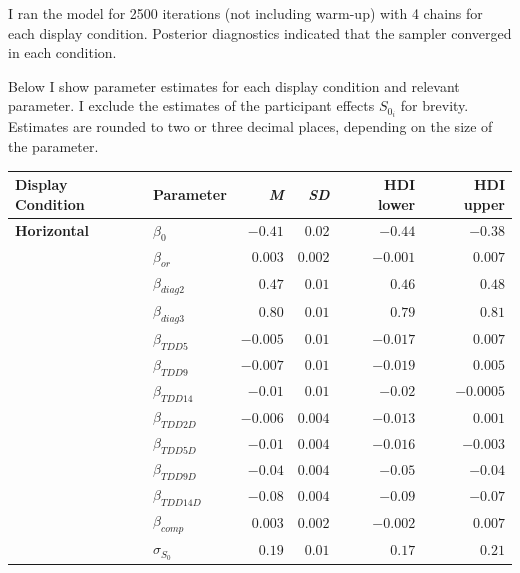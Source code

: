 I ran the model for 2500 iterations (not including warm-up) with 4 chains for each display condition. Posterior diagnostics indicated that the sampler converged in each condition.

Below I show parameter estimates for each display condition and relevant parameter. I exclude the estimates of the participant effects $S_{0_i}$ for brevity. Estimates are rounded to two or three decimal places, depending on the size of the parameter.
    
\begin{table}[ht]
    \centering
    \begin{tabular}{llrrrr}
        \toprule
        Display Condition & Parameter & \textit{M} & \textit{SD} & HDI lower & HDI upper \\
        \midrule
        \textbf{Horizontal}  &  $\beta_{0}$     &    $-0.41$   &   $0.02$    &  $-0.44$     & $-0.38$     \\
                    &  $\beta_{or}$    &    $0.003$   &   $0.002$   &  $-0.001$    & $0.007$     \\
                    &  $\beta_{diag2}$ &    $0.47$    &   $0.01$    &  $0.46$      & $0.48$      \\
                    &  $\beta_{diag3}$ &    $0.80$    &   $0.01$    &  $0.79$      & $0.81$      \\
                    &  $\beta_{TDD5}$  &    $-0.005$  &   $0.01$    &  $-0.017$    & $0.007$     \\
                    &  $\beta_{TDD9}$  &    $-0.007$  &   $0.01$    &  $-0.019$    & $0.005$     \\
                    &  $\beta_{TDD14}$ &    $-0.01$   &   $0.01$    &  $-0.02$     & $-0.0005$   \\
                    &  $\beta_{TDD2D}$ &    $-0.006$  &   $0.004$   &  $-0.013$    & $0.001$     \\
                    &  $\beta_{TDD5D}$ &    $-0.01$   &   $0.004$   &  $-0.016$    & $-0.003$    \\
                    &  $\beta_{TDD9D}$ &    $-0.04$   &   $0.004$   &  $-0.05$     & $-0.04$     \\
                    &  $\beta_{TDD14D}$&    $-0.08$   &   $0.004$   &  $-0.09$     & $-0.07$     \\
                    &  $\beta_{comp}$  &    $0.003$   &   $0.002$   &  $-0.002$    & $0.007$     \\
                    &  $\sigma_{S_0}$  &    $0.19$    &   $0.01$    &  $0.17$      & $0.21$      \\

\end{tabular}
\end{table}
